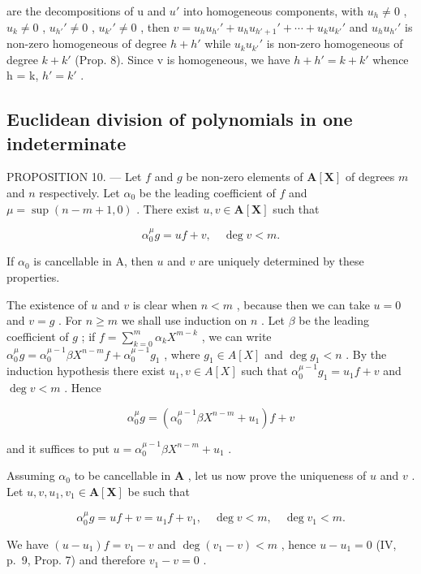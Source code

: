 are the decompositions of u and \(u'\) into homogeneous components, with \(u_{h} \neq 0\) , \(u_{k} \neq 0\) , \(u_{h'}' \neq 0\) , \(u_{k'}' \neq 0\) , then \(v = u_{h} u_{h'}' + u_{h} u_{h'+1}' + \cdots + u_{k} u_{k'}'\) and \(u_{h} u_{h'}'\) is non-zero homogeneous of degree \(h + h'\) while \(u_{k} u_{k'}'\) is non-zero homogeneous of degree \(k + k'\) (Prop. 8). Since v is homogeneous, we have \(h + h' = k + k'\) whence h = k, \(h' = k'\) .

\subsection{Euclidean division of polynomials in one indeterminate}

PROPOSITION 10. --- Let \(f\) and \(g\) be non-zero elements of \(\mathbf{A}[\mathbf{X}]\) of degrees \(m\) and \(n\) respectively. Let \(\alpha_0\) be the leading coefficient of \(f\) and \(\mu = \sup (n - m + 1, 0)\) . There exist \(u, v \in \mathbf{A}[\mathbf{X}]\) such that

\[
\alpha_ {0} ^ {\mu} g = u f + v, \quad \deg v <   m.
\]

If \(\alpha_0\) is cancellable in A, then \(u\) and \(v\) are uniquely determined by these properties.

The existence of \(u\) and \(v\) is clear when \(n < m\) , because then we can take \(u = 0\) and \(v = g\) . For \(n \geqslant m\) we shall use induction on \(n\) . Let \(\beta\) be the leading coefficient of \(g\) ; if \(f = \sum_{k=0}^{m} \alpha_k X^{m-k}\) , we can write \(\alpha_0^\mu g = \alpha_0^{\mu-1} \beta X^{n-m} f + \alpha_0^{\mu-1} g_1\) , where \(g_1 \in A[X]\) and \(\deg g_1 < n\) . By the induction hypothesis there exist \(u_1, v \in A[X]\) such that \(\alpha_0^{\mu-1} g_1 = u_1 f + v\) and \(\deg v < m\) . Hence

\[
\alpha_ {0} ^ {\mu} g = \left(\alpha_ {0} ^ {\mu - 1} \beta X ^ {n - m} + u _ {1}\right) f + v
\]

and it suffices to put \(u = \alpha_0^{\mu - 1}\beta X^{n - m} + u_1\) .

Assuming \(\alpha_0\) to be cancellable in \(\mathbf{A}\) , let us now prove the uniqueness of \(u\) and \(v\) . Let \(u, v, u_1, v_1 \in \mathbf{A}[\mathbf{X}]\) be such that

\[
\alpha_ {0} ^ {\mu} g = u f + v = u _ {1} f + v _ {1}, \quad \deg v <   m, \quad \deg v _ {1} <   m.
\]

We have \((u - u_{1})f = v_{1} - v\) and \(\deg (v_1 - v) < m\) , hence \(u - u_{1} = 0\) (IV, p.~9, Prop. 7) and therefore \(v_{1} - v = 0\) .

